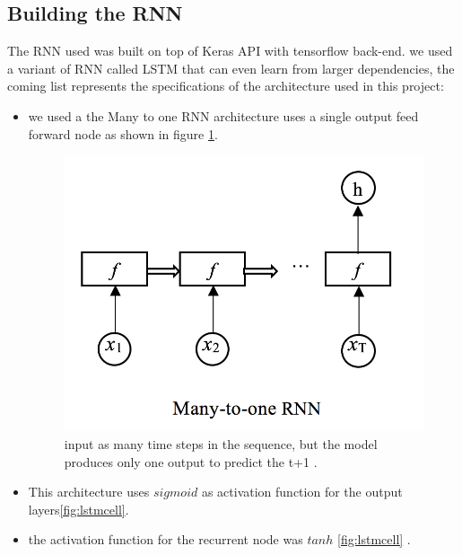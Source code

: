 \subsection{Building the RNN}
The RNN used was built on top of Keras API\cite{keras2015} with tensorflow  back-end. we used a variant of RNN called LSTM  that can even learn from larger dependencies, the coming list represents the specifications of the architecture used in this project:
\begin{itemize}
\item we used a the Many to one RNN architecture  uses a single output feed forward node as shown in figure \ref{fig:manyto_one}.

\begin{figure}[H]
\centering
\includegraphics[scale=.3]{img/many_to_one.png} 
\caption{input as many time steps in the sequence, but the model produces only one output to predict the t+1 .}
\label{fig:manyto_one}
\end{figure}

    \item This architecture uses  $sigmoid$  as activation function for the output layers\ref{fig:lstmcell}.
    \item the activation function for the recurrent node was $tanh$ \ref{fig:lstmcell} .
\end{itemize}

